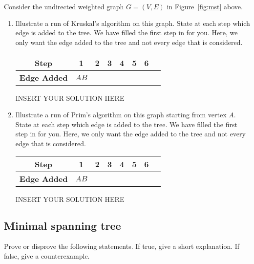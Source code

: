 Consider the undirected weighted graph $G = (V, E)$ in Figure~\ref{fig:mst} above.
\begin{enumerate}
    \item  Illustrate a run of Kruskal's algorithm on this graph. State at each step which edge is added to the tree. We have filled the first step in for you. Here, we only want the edge added to the tree and not every edge that is considered. 
    
    \begin{center}
    \begin{tabular}{c|c|c|c|c|c|c|c}
         \textbf{Step} & 1 & 2 & 3 & 4 & 5 & 6\\
         \hline
         \textbf{Edge Added} & $AB$ &   &   &   &   & \\
    \end{tabular}
    \end{center}
\begin{solution}   INSERT YOUR SOLUTION HERE   \end{solution}
    \item Illustrate a run of Prim's algorithm on this graph starting from vertex $A$. State at each step which edge is added to the tree. We have filled the first step in for you. Here, we only want the edge added to the tree and not every edge that is considered. 
    
    \begin{center}
    \begin{tabular}{c|c|c|c|c|c|c|c}
         \textbf{Step} & 1 & 2 & 3 & 4 & 5 & 6\\
         \hline
         \textbf{Edge Added} & $AB$ &   &   &   &   &  \\
    \end{tabular}
    \end{center}
\begin{solution}   INSERT YOUR SOLUTION HERE   \end{solution}
\end{enumerate}


\subsection{Minimal spanning tree}
Prove or disprove the following statements. If true, give a short explanation. If false, give a counterexample.

